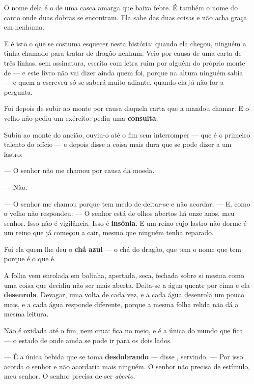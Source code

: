 \documentclass[livro.tex]{subfiles}
\begin{document}
O nome dela é o de uma casca amarga que baixa febre. É também o nome do canto onde duas dobras se
encontram. Ela sabe das duas coisas e não acha graça em nenhuma.

\medskip

E é isto o que se costuma esquecer nesta história: quando ela chegou, ninguém a tinha chamado
para tratar de dragão nenhum. Veio por causa de uma carta de três linhas, sem assinatura, escrita
com letra ruim por alguém do próprio monte de \Ven --- e este livro não vai dizer ainda quem foi,
porque na altura ninguém sabia --- e quem a escreveu só se saberá muito adiante, quando ela já não for a pergunta.

Foi depois de subir ao monte por causa daquela carta que \Odo a mandou chamar. E o velho não
pediu um exército: pediu uma \textbf{consulta}.

Subiu \Qui ao monte do ancião, ouviu-o até o fim sem interromper --- que é o primeiro talento do
ofício --- e depois disse a coisa mais dura que se pode dizer a um lastro:

--- O senhor não me chamou por causa da moeda.

--- Não.

--- O senhor me chamou porque tem medo de deitar-se e não acordar. --- E, como o velho não
respondeu: --- O senhor está de olhos abertos há onze anos, meu senhor. Isso não é vigilância.
Isso é \textbf{insônia}. E um reino cujo lastro não dorme é um reino que já começou a cair,
mesmo que ninguém tenha reparado.

\medskip

Foi ela quem lhe deu o \textbf{chá azul} --- o chá do dragão, que tem o nome que tem porque é o
que é.

A folha vem enrolada em bolinha, apertada, seca, fechada sobre si mesma como uma coisa que
decidiu não ser mais aberta. Deita-se a água quente por cima e ela \textbf{desenrola}. Devagar,
uma volta de cada vez, e a cada água desenrola um pouco mais, e a cada água responde diferente,
porque a mesma folha relida não dá a mesma leitura.

Não é oxidada até o fim, nem crua: fica no meio, e é a única do mundo que fica --- o estado de
onde ainda se pode ir para os dois lados.

--- É a única bebida que se toma \textbf{desdobrando} --- disse \Qui , servindo. --- Por isso
acorda o senhor e não acordaria mais ninguém. O senhor não precisa de estímulo, meu senhor. O
senhor precisa de ser \emph{aberto}.
\end{document}

